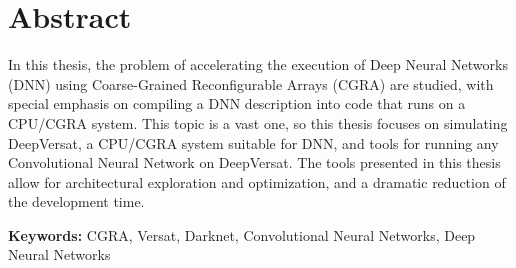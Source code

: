 
\section*{Abstract}


In this thesis, the problem of accelerating the execution of Deep Neural
Networks (DNN) using Coarse-Grained Reconfigurable Arrays (CGRA) are studied,
with special emphasis on compiling a DNN description into code that runs on a
CPU/CGRA system. This topic is a vast one, so this thesis focuses on simulating
DeepVersat, a CPU/CGRA system suitable for DNN, and tools for running any
Convolutional Neural Network on DeepVersat. The tools presented in this thesis
allow for architectural exploration and optimization, and a dramatic reduction
of the development time.


\vfill

\textbf{\Large Keywords:} CGRA, Versat, Darknet, Convolutional Neural Networks, Deep Neural Networks


